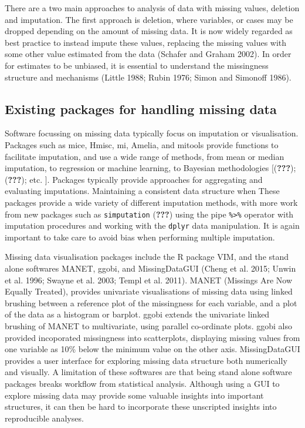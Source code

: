 \documentclass[]{article}
\begin{document}
There are a two main approaches to analysis of data with missing values,
deletion and imputation. The first approach is deletion, where
variables, or cases may be dropped depending on the amount of missing
data. It is now widely regarded as best practice to instead impute these
values, replacing the missing values with some other value estimated
from the data (Schafer and Graham 2002). In order for estimates to be
unbiased, it is essential to understand the missingness structure and
mechanisms (Little 1988; Rubin 1976; Simon and Simonoff 1986).

\subsection{Existing packages for handling missing
data}\label{existing-packages-for-handling-missing-data}

Software focussing on missing data typically focus on imputation or
visualisation. Packages such as mice, Hmisc, mi, Amelia, and mitools
provide functions to facilitate imputation, and use a wide range of
methods, from mean or median imputation, to regression or machine
learning, to Bayesian methodologies {[}({\textbf{???}});
({\textbf{???}}); etc. {]}. Packages typically provide approaches for
aggregating and evaluating imputations. Maintaining a consistent data
structure when These packages provide a wide variety of different
imputation methods, with more work from new packages such as
\texttt{simputation} ({\textbf{???}}) using the pipe
\texttt{\%\textgreater{}\%} operator with imputation procedures and
working with the \texttt{dplyr} data manipulation. It is again important
to take care to avoid bias when performing multiple imputation.

Missing data visualisation packages include the R package VIM, and the
stand alone softwares MANET, ggobi, and MissingDataGUI (Cheng et al.
2015; Unwin et al. 1996; Swayne et al. 2003; Templ et al. 2011). MANET
(Missings Are Now Equally Treated), provides univariate visualisations
of missing data using linked brushing between a reference plot of the
missingness for each variable, and a plot of the data as a histogram or
barplot. ggobi extends the univariate linked brushing of MANET to
multivariate, using parallel co-ordinate plots. ggobi also provided
incoporated missingness into scatterplots, displaying missing values
from one variable as 10\% below the minimum value on the other axis.
MissingDataGUI provides a user interface for exploring missing data
structure both numerically and visually. A limitation of these softwares
are that being stand alone software packages breaks workflow from
statistical analysis. Although using a GUI to explore missing data may
provide some valuable insights into important structures, it can then be
hard to incorporate these unscripted insights into reproducible
analyses.
\end{document}
